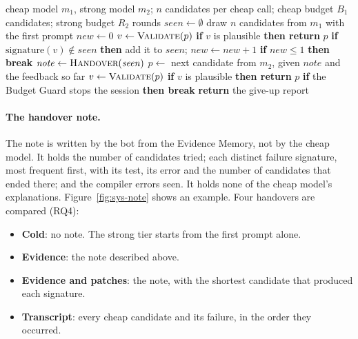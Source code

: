 \begin{algorithm}[htbp]
\caption{\Step{} for one session}
\label{alg:step}
\begin{algorithmic}[1]
\Require cheap model $m_1$, strong model $m_2$; $n$ candidates per cheap call; cheap budget $B_1$ candidates; strong budget $R_2$ rounds
\State $\mathit{seen} \gets \emptyset$ 
  \State draw $n$ candidates from $m_1$ with the first prompt
  \State $\mathit{new} \gets 0$
    \State $v \gets \Call{Validate}{p}$ 
    \State \textbf{if} $v$ is plausible \textbf{then return} $p$
    \State \textbf{if} $\mathrm{signature}(v) \notin \mathit{seen}$ \textbf{then} add it to $\mathit{seen}$;\; $\mathit{new} \gets \mathit{new} + 1$
  \EndFor
  \State \textbf{if} $\mathit{new} \le 1$ \textbf{then break} 
\EndWhile
\State $\mathit{note} \gets \Call{Handover}{\mathit{seen}}$ 
  \State $p \gets$ next candidate from $m_2$, given $\mathit{note}$ and the feedback so far
  \State $v \gets \Call{Validate}{p}$
  \State \textbf{if} $v$ is plausible \textbf{then return} $p$
  \State \textbf{if} the Budget Guard stops the session \textbf{then break} 
\EndFor
\State \textbf{return} the give-up report
\end{algorithmic}
\end{algorithm}

\paragraph{The handover note.} The note is written by the bot from the
Evidence Memory, not by the cheap model. It holds the number of candidates
tried; each distinct failure signature, most frequent first, with its test,
its error and the number of candidates that ended there; and the compiler
errors seen. It holds none of the cheap model's explanations.
Figure~\ref{fig:sys-note} shows an example. Four handovers are compared (RQ4):
\begin{itemize}
\item \textbf{Cold}: no note. The strong tier starts from the first prompt
alone.
\item \textbf{Evidence}: the note described above.
\item \textbf{Evidence and patches}: the note, with the shortest candidate
that produced each signature.
\item \textbf{Transcript}: every cheap candidate and its failure, in the order
they occurred.
\end{itemize}

